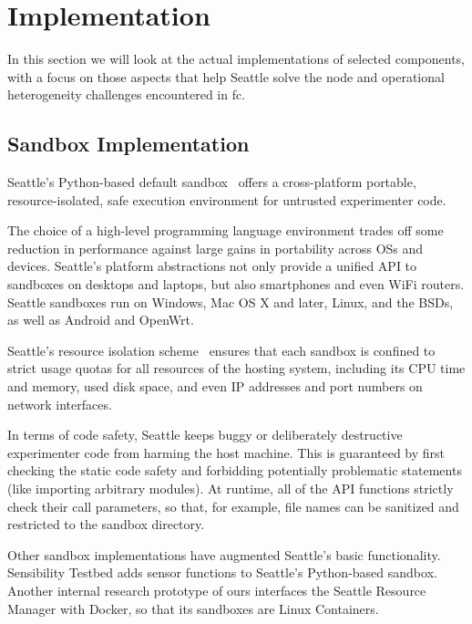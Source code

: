 \section{Implementation}

In this section we will look at the actual implementations of
selected components, with a focus on those aspects that help
Seattle solve the node and operational heterogeneity
challenges encountered in \gls{fc}.

\subsection{Sandbox Implementation}

Seattle's Python-based default sandbox~\cite{RepySandbox}
offers a cross-platform portable, resource-isolated,
safe execution environment for untrusted experimenter code.

The choice of a high-level programming language environment trades
off some reduction in performance against large gains in portability
across \glspl{OS} and devices. Seattle's platform abstractions not only
provide a unified \gls{API} to sandboxes on desktops and laptops,
but also smartphones and even WiFi routers. Seattle sandboxes
run on Windows, Mac OS X and later, Linux, and the \glspl{BSD}, as
well as Android and OpenWrt.

Seattle's resource isolation scheme~\cite{li2015fence} ensures
that each sandbox is confined to strict usage quotas for all
resources of the hosting system, including its \gls{CPU} time and
memory, used disk space, and even \gls{IP} addresses and port numbers
on network interfaces.

In terms of code safety, Seattle keeps buggy or deliberately destructive
experimenter code from harming the host machine. This is guaranteed
by first checking the static code safety and forbidding potentially
problematic statements (like importing arbitrary modules). At runtime,
all of the \gls{API} functions strictly check their call parameters,
so that, for example, file names can be sanitized and restricted to the
sandbox directory.

Other sandbox implementations have augmented Seattle's basic functionality.
Sensibility Testbed adds sensor functions to Seattle's Python-based
sandbox. Another internal research prototype of ours interfaces the
Seattle Resource Manager with Docker, so that its sandboxes are
Linux Containers.



